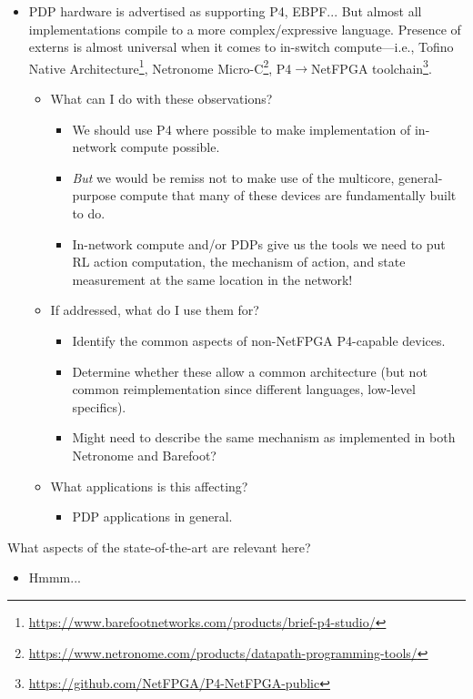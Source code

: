 \documentclass[sigconf,natbib=false]{acmart}
\begin{document}
\begin{itemize}
	\item PDP hardware is advertised as supporting P4, EBPF... But almost all implementations compile to a more complex/expressive language. Presence of externs is almost universal when it comes to in-switch compute---i.e., Tofino Native Architecture\footnote{\url{    https://www.barefootnetworks.com/products/brief-p4-studio/}}, Netronome Micro-C\footnote{\url{https://www.netronome.com/products/datapath-programming-tools/}}, P4$\rightarrow$NetFPGA toolchain\footnote{\url{https://github.com/NetFPGA/P4-NetFPGA-public}}.
	\begin{itemize}
		\item What can I do with these observations?
		\begin{itemize}
			\item We should use P4 where possible to make implementation of in-network compute possible.
			\item \emph{But} we would be remiss not to make use of the multicore, general-purpose compute that many of these devices are fundamentally built to do.
			\item In-network compute and/or PDPs give us the tools we need to put RL action computation, the mechanism of action, and state measurement at the same location in the network!
		\end{itemize}
		\item If addressed, what do I use them for?
		\begin{itemize}
			\item Identify the common aspects of non-NetFPGA P4-capable devices.
			\item Determine whether these allow a common architecture (but not common reimplementation since different languages, low-level specifics).
			\item Might need to describe the same mechanism as implemented in both Netronome and Barefoot?
		\end{itemize}
		\item What applications is this affecting?
		\begin{itemize}
			\item PDP applications in general.
		\end{itemize}
	\end{itemize}
\end{itemize}

What aspects of the state-of-the-art are relevant here?

\begin{itemize}
	\item Hmmm...
\end{itemize}
\end{document}
